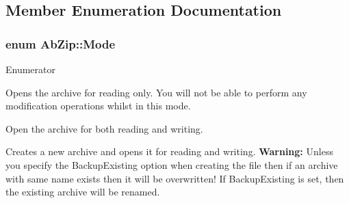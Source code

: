 \subsection{Member Enumeration Documentation}
\subsubsection[{\texorpdfstring{Mode}{Mode}}]{\setlength{\rightskip}{0pt plus 5cm}enum {\bf Ab\+Zip\+::\+Mode}}\hypertarget{class_ab_zip_ad24114feac0d38566f6b36f5fc0db54e}{}\label{class_ab_zip_ad24114feac0d38566f6b36f5fc0db54e}
\begin{Desc}
\item[Enumerator]\par
\begin{description}
\item[{\em 
mode\+Open\+Read\hypertarget{class_ab_zip_ad24114feac0d38566f6b36f5fc0db54eab1422ad58f4dcd50cff8ce563ec8a806}{}\label{class_ab_zip_ad24114feac0d38566f6b36f5fc0db54eab1422ad58f4dcd50cff8ce563ec8a806}
}]Opens the archive for reading only. You will not be able to perform any modification operations whilst in this mode. \item[{\em 
mode\+Open\+Write\hypertarget{class_ab_zip_ad24114feac0d38566f6b36f5fc0db54eacf5b3a4319c2d25e81ba95bef0ac3041}{}\label{class_ab_zip_ad24114feac0d38566f6b36f5fc0db54eacf5b3a4319c2d25e81ba95bef0ac3041}
}]Open the archive for both reading and writing. \item[{\em 
mode\+Create\+New\hypertarget{class_ab_zip_ad24114feac0d38566f6b36f5fc0db54ea9c1fc83e455d4baf3dacee9e691616b8}{}\label{class_ab_zip_ad24114feac0d38566f6b36f5fc0db54ea9c1fc83e455d4baf3dacee9e691616b8}
}]Creates a new archive and opens it for reading and writing. {\bfseries Warning\+:} Unless you specify the Backup\+Existing option when creating the file then if an archive with same name exists then it will be overwritten! If Backup\+Existing is set, then the existing archive will be renamed. \end{description}
\end{Desc}
